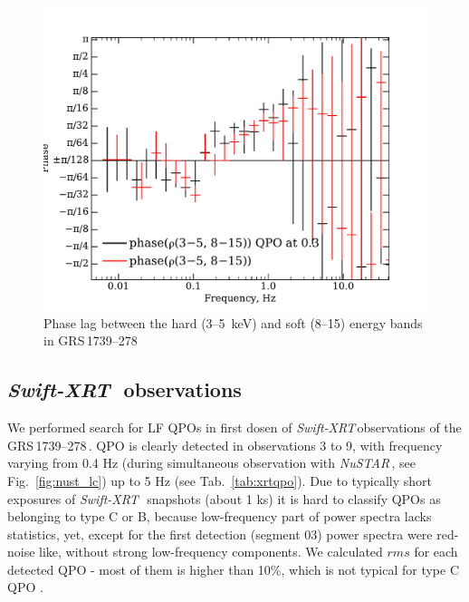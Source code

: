 \documentclass[a4paper,fleqn,usenatbib]{mnras}
\def\grs{{GRS\,1739--278\,}}
\def\swiftx{{\em Swift-XRT\,}}
\def\nustar{{\em NuSTAR\,}}
\begin{document}

\begin{figure}
        \includegraphics[width=\columnwidth]{phase_lags_traced_and_not.pdf}
        \caption{Phase lag between the hard (3--5~keV) and soft (8--15) energy bands in \grs}
        \label{fig:phase_lag}
\end{figure}

\subsection{\swiftx\, observations}
We performed search for LF QPOs in first dosen of \swiftx observations of the \grs. QPO is clearly detected in observations 3 to 9, with frequency varying from 0.4 Hz (during simultaneous observation with \nustar, see Fig.~\ref{fig:nust_lc}) up to 5 Hz (see Tab.~\ref{tab:xrtqpo}). Due to typically short exposures of \swiftx\, snapshots (about 1 ks) it is hard to classify QPOs as belonging to type C or B, because low-frequency part of power spectra lacks statistics, yet, except for the first detection (segment 03) power spectra were red-noise like, without strong low-frequency components. We calculated $rms$ for each detected QPO - most of them is higher than 10\%, which is not typical for type C QPO \citep{casella05}.
\end{document}

